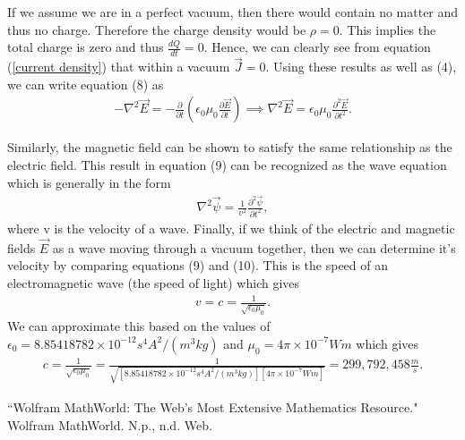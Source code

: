 \documentclass[11pt]{article}
\begin{document}
If we assume we are in a perfect vacuum, then there would contain no matter and thus no charge. Therefore the charge density would be $\rho=0$. This implies the total charge is zero and thus $\frac{dQ}{dt}=0$. Hence, we can clearly see from equation (\ref{current density}) that within a vacuum $\vec{J}=0$. Using these results as well as (4), we can write equation (8) as
\begin{align}
-\nabla^2\vec{E} = -\frac{\partial}{\partial t}\left(\epsilon_0\mu_0\frac{\partial \vec{E}}{\partial t}\right) \implies \nabla^2\vec{E} = \epsilon_0\mu_0\frac{\partial^2 \vec{E}}{\partial t^2}.
\end{align}

Similarly, the magnetic field can be shown to satisfy the same relationship as the electric field. This result in equation (9) can be recognized as the wave equation which is generally in the form
\begin{align}
\nabla^2\vec{\psi} = \frac{1}{v^2}\frac{\partial^2 \vec{\psi}}{\partial t^2},
\end{align}
where v is the velocity of a wave. Finally, if we think of the electric and magnetic fields $\vec{E}$ as a wave moving through a vacuum together, then we can determine it's velocity by comparing equations (9) and (10). This is the speed of an electromagnetic wave (the speed of light) which gives
\begin{align}
v=c=\frac{1}{\sqrt{\epsilon_0\mu_0}}.
\end{align}
We can approximate this based on the values of $\epsilon_0 = 8.85418782 \times 10^{-12}  s^4 A^2/(m^3 kg)$ and $\mu_0 =4\pi \times 10^{-7} Wm$ which gives
\begin{align}
c=\frac{1}{\sqrt{\epsilon_0\mu_0}} = \frac{1}{\sqrt{[8.85418782 \times 10^{-12}  s^4 A^2/(m^3 kg)][4\pi \times 10^{-7} Wm]}} = \boxed{299,792,458 \frac{m}{s}}.
\end{align}


\begin{thebibliography}{9}
	 ``Wolfram MathWorld: The Web's Most Extensive Mathematics Resource." Wolfram MathWorld. N.p., n.d. Web. 
\end{thebibliography}


\end{document}
